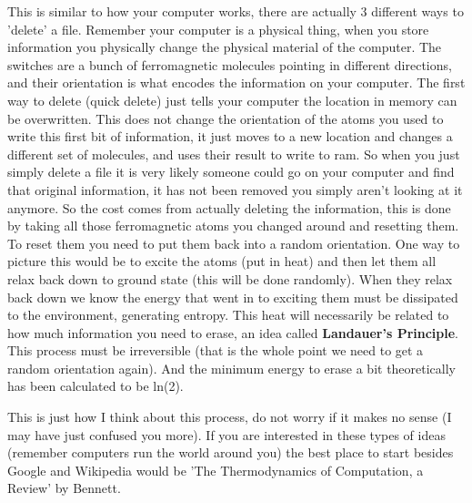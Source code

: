 \documentclass{article}
\begin{document}
This is similar to how your computer works, there are actually 3 different ways to 'delete' a file. 
Remember your computer is a physical thing, when you store information you physically change the physical material of the computer. 
The switches are a bunch of ferromagnetic molecules pointing in different directions, and their orientation is what encodes the information on your computer. 
The first way to delete (quick delete) just tells your computer the location in memory can be overwritten.
This does not change the orientation of the atoms you used to write this first bit of information, it just moves to a new location and changes a different set of molecules, and uses their result to write to ram. 
So when you just simply delete a file it is very likely someone could go on your computer and find that original information, it has not been removed you simply aren't looking at it anymore. 
So the cost comes from actually deleting the information, this is done by taking all those ferromagnetic atoms you changed around and resetting them.
To reset them you need to put them back into a random orientation. 
One way to picture this would be to excite the atoms (put in heat) and then let them all relax back down to ground state (this will be done randomly).
When they relax back down we know the energy that went  in to exciting them must be dissipated to the environment, generating entropy. 
This heat will necessarily be related to how much information you need to erase, an idea called \textbf{Landauer's Principle}.
This process must be irreversible (that is the whole point we need to get a random orientation again). 
And the minimum energy to erase a bit theoretically has been calculated to be ln(2). 

This is just how I think about this process, do not worry if it makes no sense (I may have just confused you more). 
If you are interested in these types of ideas (remember computers run the world around you) the best place to start besides Google and Wikipedia would be 'The Thermodynamics of Computation, a Review' by Bennett. 
\end{document}
